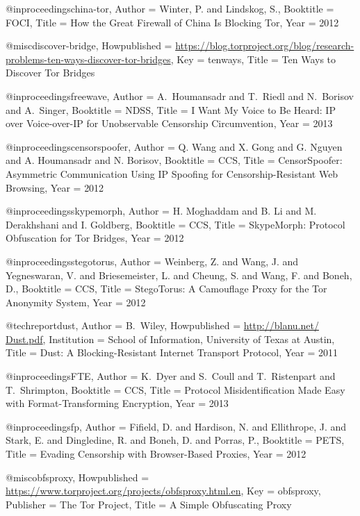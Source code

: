 {{{{{	@inproceedings{china-tor,
	Author = {Winter, P. and Lindskog, S.},
	Booktitle = {{FOCI}},
	Title = {{How the Great Firewall of China Is Blocking Tor}},
	Year = {2012}}
	
	@misc{discover-bridge,
	Howpublished = {\url{https://blog.torproject.org/blog/research-problems-ten-ways-discover-tor-bridges}},
	Key = {tenways},
	Title = {{Ten Ways to Discover Tor Bridges}}}
	
	@inproceedings{freewave,
	Author = {A.~Houmansadr and T.~Riedl and N.~Borisov and A.~Singer},
	Booktitle = {{NDSS}},
	Title = {{I Want My Voice to Be Heard: IP over Voice-over-IP for Unobservable Censorship Circumvention}},
	Year = 2013}
	
	@inproceedings{censorspoofer,
	Author = {Q. Wang and X. Gong and G. Nguyen and A. Houmansadr and N. Borisov},
	Booktitle = {CCS},
	Title = {{CensorSpoofer: Asymmetric Communication Using IP Spoofing for Censorship-Resistant Web Browsing}},
	Year = {2012}}
	
	@inproceedings{skypemorph,
	Author = {H. Moghaddam and B. Li and M. Derakhshani and I. Goldberg},
	Booktitle = {CCS},
	Title = {{SkypeMorph: Protocol Obfuscation for Tor Bridges}},
	Year = {2012}}
	
	@inproceedings{stegotorus,
	Author = {Weinberg, Z. and Wang, J. and Yegneswaran, V. and Briesemeister, L. and Cheung, S. and Wang, F. and Boneh, D.},
	Booktitle = {CCS},
	Title = {{StegoTorus: A Camouflage Proxy for the Tor Anonymity System}},
	Year = {2012}}
	
	@techreport{dust,
	Author = {{B.~Wiley}},
	Howpublished = {\url{http://blanu.net/ Dust.pdf}},
	Institution = {School of Information, University of Texas at Austin},
	Title = {{Dust: A Blocking-Resistant Internet Transport Protocol}},
	Year = {2011}}
	
	@inproceedings{FTE,
	Author = {K.~Dyer and S.~Coull and T.~Ristenpart and T.~Shrimpton},
	Booktitle = {CCS},
	Title = {{Protocol Misidentification Made Easy with Format-Transforming Encryption}},
	Year = {2013}}
	
	@inproceedings{fp,
	Author = {Fifield, D. and Hardison, N. and Ellithrope, J. and Stark, E. and Dingledine, R. and Boneh, D. and Porras, P.},
	Booktitle = {PETS},
	Title = {{Evading Censorship with Browser-Based Proxies}},
	Year = {2012}}
	
	@misc{obfsproxy,
	Howpublished = {\url{https://www.torproject.org/projects/obfsproxy.html.en}},
	Key = {obfsproxy},
	Publisher = {The Tor Project},
	Title = {{A Simple Obfuscating Proxy}}}
	
}}}}}
